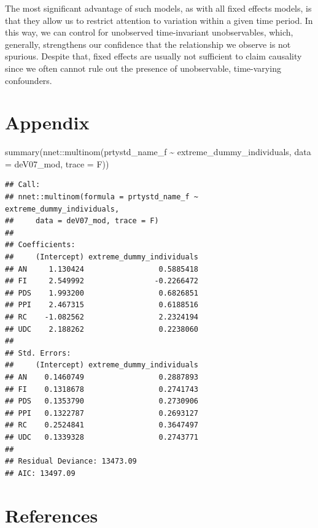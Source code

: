 \documentclass[
]{article}
\newenvironment{Shaded}{\begin{snugshade}}{\end{snugshade}}
\newcommand{\AttributeTok}[1]{\textcolor[rgb]{0.77,0.63,0.00}{#1}}
\newcommand{\FunctionTok}[1]{\textcolor[rgb]{0.00,0.00,0.00}{#1}}
\newcommand{\NormalTok}[1]{#1}
\newcommand{\SpecialCharTok}[1]{\textcolor[rgb]{0.00,0.00,0.00}{#1}}
\begin{document}
The most significant advantage of such models, as with all fixed effects
models, is that they allow us to restrict attention to variation within
a given time period. In this way, we can control for unobserved
time-invariant unobservables, which, generally, strengthens our
confidence that the relationship we observe is not spurious. Despite
that, fixed effects are usually not sufficient to claim causality since
we often cannot rule out the presence of unobservable, time-varying
confounders.

\hypertarget{appendix}{%
\section{Appendix}\label{appendix}}

\begin{Shaded}
\begin{Highlighting}[]
\FunctionTok{summary}\NormalTok{(nnet}\SpecialCharTok{::}\FunctionTok{multinom}\NormalTok{(prtystd\_name\_f }\SpecialCharTok{\textasciitilde{}}\NormalTok{ extreme\_dummy\_individuals,}
                       \AttributeTok{data =}\NormalTok{ deV07\_mod, }\AttributeTok{trace =}\NormalTok{ F))}
\end{Highlighting}
\end{Shaded}

\begin{verbatim}
## Call:
## nnet::multinom(formula = prtystd_name_f ~ extreme_dummy_individuals, 
##     data = deV07_mod, trace = F)
## 
## Coefficients:
##     (Intercept) extreme_dummy_individuals
## AN     1.130424                 0.5885418
## FI     2.549992                -0.2266472
## PDS    1.993200                 0.6826851
## PPI    2.467315                 0.6188516
## RC    -1.082562                 2.2324194
## UDC    2.188262                 0.2238060
## 
## Std. Errors:
##     (Intercept) extreme_dummy_individuals
## AN    0.1460749                 0.2887893
## FI    0.1318678                 0.2741743
## PDS   0.1353790                 0.2730906
## PPI   0.1322787                 0.2693127
## RC    0.2524841                 0.3647497
## UDC   0.1339328                 0.2743771
## 
## Residual Deviance: 13473.09 
## AIC: 13497.09
\end{verbatim}

\FloatBarrier

\hypertarget{references}{%
\section*{References}\label{references}}
\end{document}
